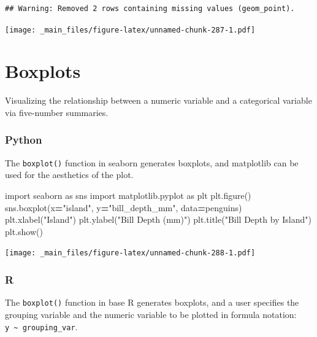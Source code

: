 \documentclass[
]{book}
\newenvironment{Shaded}{\begin{snugshade}}{\end{snugshade}}
\newcommand{\ImportTok}[1]{#1}
\newcommand{\NormalTok}[1]{#1}
\newcommand{\OperatorTok}[1]{\textcolor[rgb]{0.81,0.36,0.00}{\textbf{#1}}}
\newcommand{\StringTok}[1]{\textcolor[rgb]{0.31,0.60,0.02}{#1}}
\begin{document}
\begin{verbatim}
## Warning: Removed 2 rows containing missing values (geom_point).
\end{verbatim}

\texttt{[image: \_main\_files/figure-latex/unnamed-chunk-287-1.pdf]}

\hypertarget{boxplots}{%
\section{Boxplots}\label{boxplots}}

Visualizing the relationship between a numeric variable and a categorical variable via five-number summaries.

\hypertarget{python-45}{%
\subsubsection*{Python}\label{python-45}}

The \texttt{boxplot()} function in seaborn generates boxplots, and matplotlib can be used for the aesthetics of the plot.

\begin{Shaded}
\begin{Highlighting}[]
\ImportTok{import}\NormalTok{ seaborn }\ImportTok{as}\NormalTok{ sns}
\ImportTok{import}\NormalTok{ matplotlib.pyplot }\ImportTok{as}\NormalTok{ plt}
\NormalTok{plt.figure()}
\NormalTok{sns.boxplot(x}\OperatorTok{=}\StringTok{"island"}\NormalTok{, y}\OperatorTok{=}\StringTok{"bill\_depth\_mm"}\NormalTok{, data}\OperatorTok{=}\NormalTok{penguins)}
\NormalTok{plt.xlabel(}\StringTok{"Island"}\NormalTok{)}
\NormalTok{plt.ylabel(}\StringTok{"Bill Depth (mm)"}\NormalTok{)}
\NormalTok{plt.title(}\StringTok{"Bill Depth by Island"}\NormalTok{)}
\NormalTok{plt.show()}
\end{Highlighting}
\end{Shaded}

\texttt{[image: \_main\_files/figure-latex/unnamed-chunk-288-1.pdf]}

\hypertarget{r-45}{%
\subsubsection*{R}\label{r-45}}

The \texttt{boxplot()} function in base R generates boxplots, and a user specifies the grouping variable and the numeric variable to be plotted in formula notation: \texttt{y\ \textasciitilde{}\ grouping\_var}.
\end{document}
